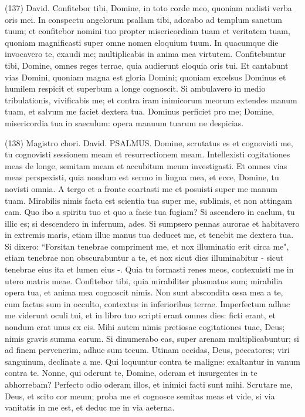 \begin{biblechapter}  (137) 
\verse David. Confitebor tibi, Domine, in toto corde meo, quoniam audisti verba oris mei. In conspectu angelorum psallam tibi, 
\verse adorabo ad templum sanctum tuum; et confitebor nomini tuo propter misericordiam tuam et veritatem tuam, quoniam magnificasti super omne nomen eloquium tuum. 
\verse In quacumque die invocavero te, exaudi me; multiplicabis in anima mea virtutem. 
\verse Confitebuntur tibi, Domine, omnes reges terrae, quia audierunt eloquia oris tui. 
\verse Et cantabunt vias Domini, quoniam magna est gloria Domini; 
\verse quoniam excelsus Dominus et humilem respicit et superbum a longe cognoscit. 
\verse Si ambulavero in medio tribulationis, vivificabis me; et contra iram inimicorum meorum extendes manum tuam, et salvum me faciet dextera tua. 
\verse Dominus perficiet pro me; Domine, misericordia tua in saeculum: opera manuum tuarum ne despicias. 
\end{biblechapter}

\begin{biblechapter}  (138) 
\verse  Magistro chori. David. PSALMUS. Domine, scrutatus es et cognovisti me, 
\verse tu cognovisti sessionem meam et resurrectionem meam. Intellexisti cogitationes meas de longe, 
\verse semitam meam et accubitum meum investigasti. Et omnes vias meas perspexisti, 
\verse quia nondum est sermo in lingua mea, et ecce, Domine, tu novisti omnia. 
\verse A tergo et a fronte coartasti me et posuisti super me manum tuam. 
\verse Mirabilis nimis facta est scientia tua super me, sublimis, et non attingam eam. 
\verse Quo ibo a spiritu tuo et quo a facie tua fugiam? 
\verse Si ascendero in caelum, tu illic es; si descendero in infernum, ades. 
\verse Si sumpsero pennas aurorae et habitavero in extremis maris, 
\verse etiam illuc manus tua deducet me, et tenebit me dextera tua. 
\verse Si dixero: “Forsitan tenebrae compriment me, et nox illuminatio erit circa me", 
\verse etiam tenebrae non obscurabuntur a te, et nox sicut dies illuminabitur - sicut tenebrae eius ita et lumen eius -. 
\verse Quia tu formasti renes meos, contexuisti me in utero matris meae. 
\verse Confitebor tibi, quia mirabiliter plasmatus sum; mirabilia opera tua, et anima mea cognoscit nimis. 
\verse Non sunt abscondita ossa mea a te, cum factus sum in occulto, contextus in inferioribus terrae. 
\verse Imperfectum adhuc me viderunt oculi tui, et in libro tuo scripti erant omnes dies: ficti erant, et nondum erat unus ex eis. 
\verse Mihi autem nimis pretiosae cogitationes tuae, Deus; nimis gravis summa earum. 
\verse Si dinumerabo eas, super arenam multiplicabuntur; si ad finem pervenerim, adhuc sum tecum. 
\verse Utinam occidas, Deus, peccatores; viri sanguinum, declinate a me. 
\verse Qui loquuntur contra te maligne: exaltantur in vanum contra te. 
\verse Nonne, qui oderunt te, Domine, oderam et insurgentes in te abhorrebam? 
\verse Perfecto odio oderam illos, et inimici facti sunt mihi. 
\verse Scrutare me, Deus, et scito cor meum; proba me et cognosce semitas meas 
\verse et vide, si via vanitatis in me est, et deduc me in via aeterna. 
\end{biblechapter}


